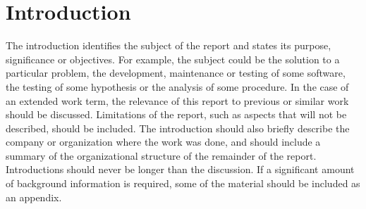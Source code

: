\section{Introduction}
	The introduction identifies the subject of the report and states its purpose, significance or objectives. For example, the subject could be the solution to a particular problem, the development, maintenance or testing of some software, the testing of some hypothesis or the analysis of some procedure. In the case of an extended work term, the relevance of this report to previous or similar work should be discussed. Limitations of the report, such as aspects that will not be described, should be included. The introduction should also briefly describe the company or organization where the work was done, and should include a summary of the organizational structure of the remainder of the report. Introductions should never be longer than the discussion. If a significant amount of background information is required, some of the material should be included as an appendix.
 